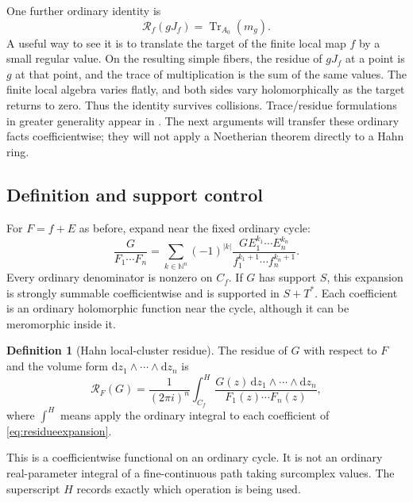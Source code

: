 \documentclass[11pt,letterpaper]{article}
\theoremstyle{definition}
\newtheorem{definition}[theorem]{Definition}
\theoremstyle{remark}
\newcommand{\N}{\mathbb N}
\newcommand{\Tr}{\operatorname{Tr}}
\newcommand{\RR}{\mathcal R}
\newcommand{\dd}{\mathrm d}
\begin{document}
One further ordinary identity is
\begin{equation}\label{eq:ordinarytrace}
 \RR_f(gJ_f)=\Tr_{A_0}(m_g).
\end{equation}
A useful way to see it is to translate the target of the finite local map $f$ by a small regular value. On the resulting simple fibers, the residue of $gJ_f$ at a point is $g$ at that point, and the trace of multiplication is the sum of the same values. The finite local algebra varies flatly, and both sides vary holomorphically as the target returns to zero. Thus the identity survives collisions. Trace/residue formulations in greater generality appear in \cite{NayakSastry}. The next arguments will transfer these ordinary facts coefficientwise; they will not apply a Noetherian theorem directly to a Hahn ring.

\subsection{Definition and support control}
For $F=f+E$ as before, expand near the fixed ordinary cycle:
\begin{equation}\label{eq:residueexpansion}
 \frac{G}{F_1\cdots F_n}
 =\sum_{k\in\N^n}(-1)^{|k|}
       \frac{G E_1^{k_1}\cdots E_n^{k_n}}
            {f_1^{k_1+1}\cdots f_n^{k_n+1}}.
\end{equation}
Every ordinary denominator is nonzero on $C_f$. If $G$ has support $S$, this expansion is strongly summable coefficientwise and is supported in $S+T^*$. Each coefficient is an ordinary holomorphic function near the cycle, although it can be meromorphic inside it.

\begin{definition}[Hahn local-cluster residue]\label{def:residue}
The residue of $G$ with respect to $F$ and the volume form $\dd z_1\wedge\cdots\wedge\dd z_n$ is
\begin{equation}\label{eq:Hresidue}
 \RR_F(G)=\frac{1}{(2\pi i)^n}\int_{C_f}^{H}
                 \frac{G(z)\,\dd z_1\wedge\cdots\wedge\dd z_n}
                      {F_1(z)\cdots F_n(z)},
\end{equation}
where $\int^H$ means apply the ordinary integral to each coefficient of \eqref{eq:residueexpansion}.
\end{definition}

This is a coefficientwise functional on an ordinary cycle. It is not an ordinary real-parameter integral of a fine-continuous path taking surcomplex values. The superscript $H$ records exactly which operation is being used.
\end{document}
